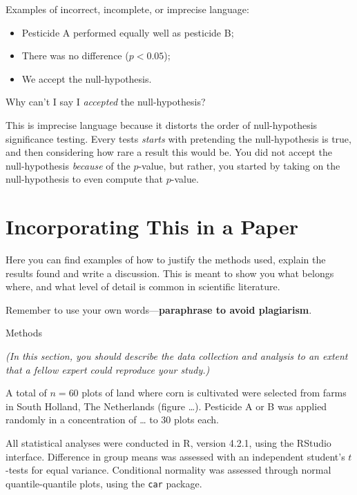 \documentclass[
]{book}
\providecommand{\tightlist}{%
  \setlength{\itemsep}{0pt}\setlength{\parskip}{0pt}}
\begin{document}
Examples of incorrect, incomplete, or imprecise language:

\begin{itemize}
\tightlist
\item
  Pesticide A performed equally well as pesticide B;
\item
  There was no difference (\(p < 0.05\));
\item
  We accept the null-hypothesis.
\end{itemize}

Why can't I say I \emph{accepted} the null-hypothesis?

This is imprecise language because it distorts the order of null-hypothesis significance testing. Every tests \emph{starts} with pretending the null-hypothesis is true, and then considering how rare a result this would be. You did not accept the null-hypothesis \emph{because} of the \(p\)-value, but rather, you started by taking on the null-hypothesis to even compute that \(p\)-value.

\hypertarget{incorporating-this-in-a-paper}{%
\section{Incorporating This in a Paper}\label{incorporating-this-in-a-paper}}

Here you can find examples of how to justify the methods used, explain the results found and write a discussion. This is meant to show you what belongs where, and what level of detail is common in scientific literature.

Remember to use your own words---\textbf{paraphrase to avoid plagiarism}.

Methods

\emph{(In this section, you should describe the data collection and analysis to an extent that a fellow expert could reproduce your study.)}

A total of \(n = 60\) plots of land where corn is cultivated were selected from farms in South Holland, The Netherlands (figure \ldots). Pesticide A or B was applied randomly in a concentration of \ldots{} to 30 plots each.

All statistical analyses were conducted in R, version 4.2.1, using the RStudio interface.\citep{R, RStudio} Difference in group means was assessed with an independent student's \(t\)-tests for equal variance. Conditional normality was assessed through normal quantile-quantile plots, using the \texttt{car} package.\citep{car}
\end{document}
